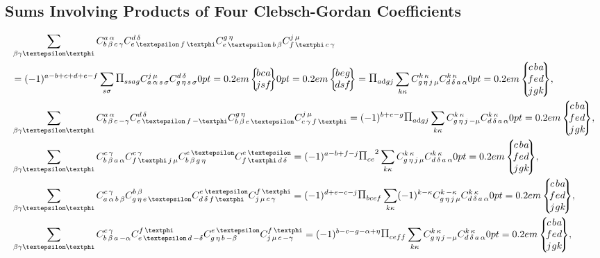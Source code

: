 \subsection{Sums Involving Products of Four Clebsch-Gordan Coefficients}\label{sec:8.7.4}
\begin{align}
& \sum_{\beta \gamma \varepsilon \varphi} \clebsch{b}{\beta}{c}{\gamma}{a}{\alpha} \clebsch{e}{\varepsilon}{f}{\varphi}{d}{\delta} \clebsch{e}{\varepsilon}{b}{\beta}{g}{\eta} \clebsch{f}{\varphi}{c}{\gamma}{j}{\mu}  \notag\\
& =(-1)^{a-b+c+d+e-f} \sum_{s \sigma} \Fact{s s a g} \clebsch{a}{\alpha}{s}{\sigma}{j}{\mu} \clebsch{g}{\eta}{s}{\sigma}{d}{\delta}\sixj{b}{c}{a}{j}{s}{f}\sixj{b}{e}{g}{d}{s}{f}=\Fact{a\dd g j} \sum_{k \kappa} \clebsch{g}{\eta}{j}{\mu}{k}{\kappa} \clebsch{d}{\delta}{a}{\alpha}{k}{\kappa}\ninej{c}{b}{a}{f}{e}{d}{j}{g}{k}, \label{eq:8:7:20}\\
& \sum_{\beta \gamma \varepsilon \varphi} \clebsch{b}{\beta}{c}{-\gamma}{a}{\alpha} \clebsch{e}{\varepsilon}{f}{-\varphi}{d}{\delta} \clebsch{b}{\beta}{e}{\varepsilon}{g}{\eta} \clebsch{c}{\gamma}{f}{\varphi}{j}{\mu}=(-1)^{b+e-g} \Fact{a\dd g j} \sum_{k \kappa} \clebsch{g}{\eta}{j}{-\mu}{k}{\kappa} \clebsch{d}{\delta}{a}{\alpha}{k}{\kappa}\ninej{c}{b}{a}{f}{e}{d}{j}{g}{k}, \label{eq:8:7:21}\\
& \sum_{\beta \gamma \varepsilon \varphi} \clebsch{b}{\beta}{a}{\alpha}{c}{\gamma} \clebsch{f}{\varphi}{j}{\mu}{c}{\gamma} \clebsch{b}{\beta}{g}{\eta}{e}{\varepsilon} \clebsch{f}{\varphi}{d}{\delta}{e}{\varepsilon}=(-1)^{a-b+f-j} \Fact{c e}^{2} \sum_{k \kappa} \clebsch{g}{\eta}{j}{\mu}{k}{\kappa} \clebsch{d}{\delta}{a}{\alpha}{k}{\kappa}\ninej{c}{b}{a}{f}{e}{d}{j}{g}{k}, \label{eq:8:7:22}\\
& \sum_{\beta \gamma \varepsilon \varphi} \clebsch{a}{\alpha}{b}{\beta}{c}{\gamma} \clebsch{g}{\eta}{e}{\varepsilon}{b}{\beta} \clebsch{d}{\delta}{f}{\varphi}{e}{\varepsilon} \clebsch{j}{\mu}{c}{\gamma}{f}{\varphi}=(-1)^{d+e-c-j} \Fact{b c e f} \sum_{k \kappa}(-1)^{k-\kappa} \clebsch{g}{\eta}{j}{\mu}{k}{-\kappa} \clebsch{d}{\delta}{a}{\alpha}{k}{\kappa}\ninej{c}{b}{a}{f}{e}{d}{j}{g}{k}, \label{eq:8:7:23}\\
& \sum_{\beta \gamma \varepsilon \varphi} \clebsch{b}{\beta}{a}{-\alpha}{c}{\gamma} \clebsch{e}{\varepsilon}{d}{-\delta}{f}{\varphi} \clebsch{g}{\eta}{b}{-\beta}{e}{\varepsilon} \clebsch{j}{\mu}{c}{-\gamma}{f}{\varphi}=(-1)^{b-c-g-\alpha+\eta} \Fact{c e f f} \sum_{k \kappa} \clebsch{g}{\eta}{j}{-\mu}{k}{\kappa} \clebsch{d}{\delta}{a}{\alpha}{k}{\kappa}\ninej{c}{b}{a}{f}{e}{d}{j}{g}{k}, \label{eq:8:7:24}
\end{align}
